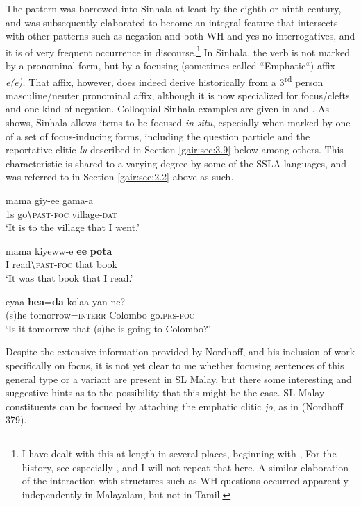  The pattern was borrowed into Sinhala at least by the eighth or ninth century, and was subsequently elaborated to become an integral feature that intersects with other patterns such as negation and both WH and yes-no interrogatives, and it is of very frequent occurrence in discourse.\footnote{I
  have dealt with this at length in several places, beginning with \citet{Gair1970}, For the history, see especially \citet{Gair1986}, and I will not repeat that here. A similar elaboration of the interaction with structures such as WH questions occurred apparently independently in Malayalam, but not in Tamil.}  In Sinhala, the verb is not marked by a pronominal form, but by a focusing (sometimes called ``Emphatic``) affix \textit{e(e).} That affix, however, does indeed derive historically from a 3\textsuperscript{rd} person masculine/neuter pronominal affix, although it is now specialized for focus/clefts and one kind of negation. Colloquial Sinhala examples are given in  and . As  shows, Sinhala allows items to be focused \textit{in} \textit{situ}, especially when marked by one of a set of focus-inducing forms, including the question particle and the reportative clitic \textit{lu} described in Section \ref{gair:sec:3.9} below among others. This characteristic is shared to a varying degree by some of the SSLA languages, and was referred to in Section \ref{gair:sec:2.2} above as such.


\ea\label{ex3.7.3} 
\gll mama giy-ee gama-{\dott}a \\
  1s go$\backslash$\textsc{past}-\textsc{foc} village-\textsc{dat} \\
  `It is to the village that I went.'
\z




\ea\label{ex3.7.4} 
\gll mama kiyeww-e \textbf{ee} \textbf{pota} \\
  I read$\backslash$\textsc{past}-\textsc{foc} that book \\
   `It was that book that I read.'
\z




\ea\label{ex3.7.5} 
\gll  eyaa \textbf{he{\dott}a}=\textbf{da} kola{\umb}a yan-ne?\\
  (s)he tomorrow=\textsc{interr} Colombo go.\textsc{prs}-\textsc{foc} \\
  `Is it tomorrow that (s)he is going to Colombo?'
\z


Despite the extensive information provided by Nordhoff, and his inclusion of work specifically on focus, it is not yet clear to me whether focusing sentences of this general type or a variant are present in SL Malay, but there some interesting and suggestive hints as to the possibility that this might be the case.
SL Malay constituents can be focused by attaching the emphatic clitic \textit{jo}, as in   (Nordhoff 379).


